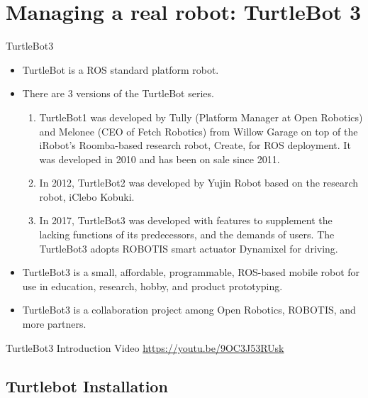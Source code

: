 \section{Managing a real robot: TurtleBot 3}%

\begin{frame}{TurtleBot3}
\begin{itemize}
 \item TurtleBot is a ROS standard platform robot.
 \item There are 3 versions of the TurtleBot series. 
  \begin{enumerate}
   \item TurtleBot1 was developed by Tully (Platform Manager at Open Robotics) and Melonee (CEO of Fetch Robotics) from Willow Garage on top of the iRobot’s Roomba-based research robot, Create, for ROS deployment. It was developed in 2010 and has been on sale since 2011. 
   \item In 2012, TurtleBot2 was developed by Yujin Robot based on the research robot, iClebo Kobuki. 
   \item In 2017, TurtleBot3 was developed with features to supplement the lacking functions of its predecessors, and the demands of users. The TurtleBot3 adopts ROBOTIS smart actuator Dynamixel for driving.
  \end{enumerate}   
 \item TurtleBot3 is a small, affordable, programmable, ROS-based mobile robot for use in education, research, hobby, and product prototyping.
 \item TurtleBot3 is a collaboration project among Open Robotics, ROBOTIS, and more partners.
\end{itemize}
\begin{block}{TurtleBot3 Introduction Video}
\url{https://youtu.be/9OC3J53RUsk}
\end{block}
\end{frame}

\subsection{Turtlebot Installation}

